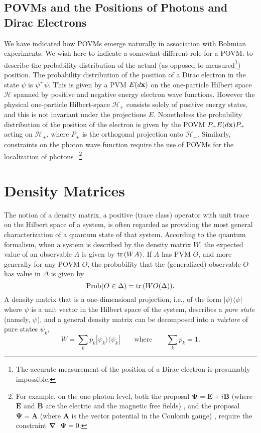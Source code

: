 \documentclass[12pt]{article}
\newcommand{\tr}{\mbox{${\rm tr}\,$}}
\renewcommand{\H}{\mbox{$\mathcal{H}$}}
\newcommand{\pro}{\mbox{Prob}}
\begin{document}
\subsection{POVMs and the Positions of Photons and Dirac Electrons}
We have indicated how POVMs emerge naturally in association with
Bohmian experiments. We wish here to indicate a somewhat different
role for a POVM: to describe the probability distribution of the
actual (as opposed to measured\footnote{The accurate measurement of
   the position of a Dirac electron is presumably impossible.})
position. The probability distribution of the position of a Dirac
electron in the state $\psi$ is $\psi^+\psi$. This is given by a PVM
$E(d{\bf x})$ on the one-particle Hilbert space $\H$ spanned by
positive and negative energy electron wave functions. However the
physical one-particle Hilbert-space $\H_+$ consists solely of positive
energy states, and this is not invariant under the projections $E$.
Nonetheless the probability distribution of the position of the
electron is given by the POVM $P_+ E(d{\bf x}) P_+$ acting on $\H_+$,
where $P_+$ is the orthogonal projection onto $\H_+$.  Similarly,
constraints on the photon wave function require the use of POVMs for
the localization of photons~\cite{Kraus, Emch}.\footnote{For example,
   on the one-photon level, both the proposal
   $\boldsymbol{\Psi}=\mathbf{E}+i \mathbf{B}$ (where $\mathbf{E}$ and
   $\mathbf{B}$ are the electric and the magnetic free fields)
   \cite{Birula}, and the proposal $\boldsymbol{\Psi}=\mathbf{A}$
   (where $\mathbf{A}$ is the vector potential in the Coulomb gauge)
   \cite{Emch}, require the constraint $\boldsymbol{\nabla}\cdot
   \boldsymbol{\Psi}=0$.}

\section{Density Matrices} \setcounter{equation}{0}

The notion of a density matrix, a positive (trace class) operator with
unit trace on the Hilbert space of a system, is often regarded as
providing the most general characterization of a quantum state of that
system.  According to the quantum formalism, when a system is
described by the density matrix $W$, the expected value of an
observable $A$ is given by $ \tr(WA)$.  If $A$ has PVM $O$, and more
generally for any POVM $O$, the probability that the (generalized)
observable $O$ has value in $\Delta$ is given by
   \begin{equation}
\pro(O\in\Delta) = \tr (W O(\Delta)).
\label{eq:den1}
   \end{equation}
   A density matrix that is a one-dimensional projection, i.e., of the
   form $|\psi\rangle\langle\psi|$ where $\psi$ is a unit vector in the
   Hilbert space of the system, describes a \emph{pure state} (namely,
   $\psi$), and a general density matrix can be decomposed into a
   \emph{mixture} of pure states $\psi_{k}$,
\begin{equation}
W =\sum_k p_k |\psi_k\rangle\langle\psi_k| \qquad\mbox{where}\qquad
\sum_{k} p_{k} =1.
\label{eq:dmsd}
\end{equation}
\end{document}
